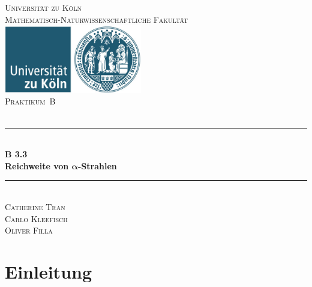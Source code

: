 \documentclass[12pt,a4paper]{scrartcl}
\numberwithin{equation}{section} %
\newcommand{\HRule}{\rule{\linewidth}{0.7mm}}
\renewcommand{\[}{} %
\renewcommand{\]}{\noindent} %
\begin{document}
\begin{titlepage}
	\pagestyle{empty}

	\begin{center}

	\textsc{\LARGE Universität zu Köln }\\ [0.4cm]
	\textsc{Mathematisch-Naturwissenschaftliche Fakultät} \\[1.5cm]

	\includegraphics[width=0.45\textwidth]{../media/uni.jpg}\\[1.5cm]  %

	\textsc{\Large Praktikum~B}\\[2mm]
	\textsc{}\\[10mm]
	\HRule \\[0.4cm]

		{	\Huge \bfseries B 3.3}\\[0.4cm]
			{	\huge \bfseries Reichweite von \(\pmb{\alpha}\)-Strahlen}\\[0.3cm]
	
	\HRule \\[3cm]

			\textsc{\Large Catherine Tran } \\[3pt]
		\textsc{\Large Carlo Kleefisch } \\[3pt]
		\textsc{\Large Oliver Filla } \\[3pt]
		
	\end{center}
\end{titlepage}

\newpage
\tableofcontents
\newpage

\hypertarget{einleitung}{%
\section{Einleitung}\label{einleitung}}
\end{document}
